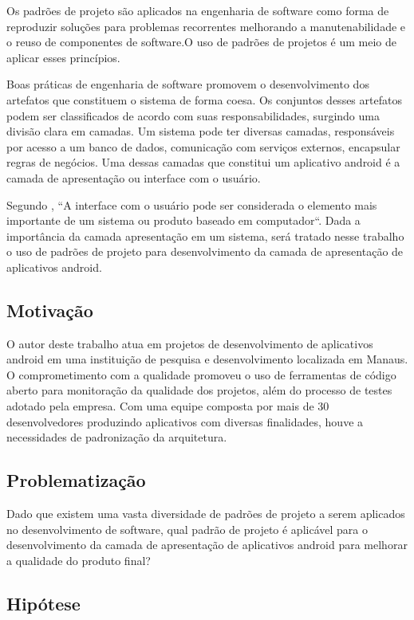 \documentclass[conference]{IEEEtran}
\begin{document}
Os padrões de projeto são aplicados na engenharia de software como forma de
reproduzir  soluções  para problemas recorrentes melhorando a manutenabilidade e
o reuso de componentes de software\cite{gof}.O uso de padrões de projetos
é um meio de aplicar esses princípios.

Boas práticas de engenharia de software promovem o desenvolvimento dos
artefatos que constituem o sistema de forma coesa. Os conjuntos desses artefatos
podem ser classificados de acordo com suas responsabilidades, surgindo
uma divisão clara em camadas. Um sistema pode ter diversas camadas, responsáveis
por acesso a um banco de dados, comunicação com serviços externos, encapsular
regras de negócios. Uma dessas camadas que constitui um aplicativo android é a
camada de apresentação ou interface com o usuário.
 
Segundo \cite{pressman}, ``A interface com o usuário pode ser considerada
o elemento mais importante de um sistema ou produto baseado em computador``.
Dada a importância da camada apresentação em um sistema, será tratado nesse
trabalho o uso de padrões de projeto para desenvolvimento da camada de
apresentação de aplicativos android.

\subsection{Motivação}

O autor deste trabalho atua em projetos de desenvolvimento de aplicativos android em uma instituição de
pesquisa e desenvolvimento localizada em Manaus. O comprometimento com a
qualidade promoveu o uso de ferramentas de código aberto para monitoração da
qualidade dos projetos, além do processo de testes adotado pela empresa. Com uma
equipe composta por mais de 30 desenvolvedores produzindo aplicativos com
diversas finalidades, houve a necessidades de padronização da arquitetura.

\subsection{Problematização}
Dado que existem uma vasta diversidade de padrões de projeto a serem aplicados
no desenvolvimento de software, qual padrão de projeto é aplicável para o
desenvolvimento da camada de apresentação de aplicativos android para melhorar a
qualidade do produto final?

\subsection{Hipótese}
\end{document}
